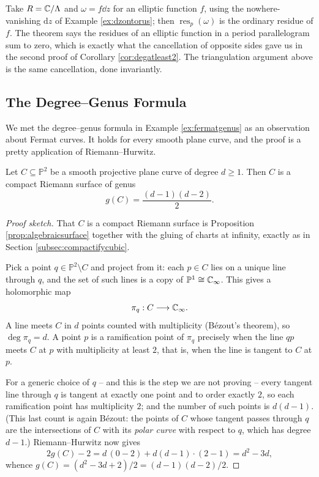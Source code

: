 \documentclass[a4paper]{scrartcl}
\newcommand{\Cinf}{\C_\infty}
\newcommand{\res}{\operatorname{res}}
\begin{document}
\begin{example}
	Take $R = \mathbb{C}/\Lambda$ and $\omega = f\dd z$ for an elliptic function $f$, using the
	nowhere-vanishing $\mathrm{d}z$ of Example \ref{ex:dzontorus}; then $\res_p(\omega)$ is the
	ordinary residue of $f$. The theorem says the residues of an elliptic function in a
	period parallelogram sum to zero, which is exactly what the cancellation of opposite
	sides gave us in the second proof of Corollary \ref{cor:degatleast2}. The
	triangulation argument above is the same cancellation, done invariantly.
\end{example}

\subsection{The Degree--Genus Formula}

We met the degree--genus formula in Example \ref{ex:fermatgenus} as an observation about
Fermat curves. It holds for every smooth plane curve, and the proof is a pretty
application of Riemann--Hurwitz.

\begin{theorem}\label{thm:degreegenus}
	Let $C \subseteq \mathbb{P}^2$ be a smooth projective plane curve of degree $d \geq 1$.
	Then $C$ is a compact Riemann surface of genus
	$$
	g(C) = \frac{(d-1)(d-2)}{2}.
	$$
\end{theorem}

\begin{proof}[Proof sketch]
	That $C$ is a compact Riemann surface is Proposition \ref{prop:algebraicsurface}
	together with the gluing of charts at infinity, exactly as in Section
	\ref{subsec:compactifycubic}.

	Pick a point $q \in \mathbb{P}^2 \setminus C$ and project from it: each $p \in C$ lies
	on a unique line through $q$, and the set of such lines is a copy of
	$\mathbb{P}^1 \cong \Cinf$. This gives a holomorphic map
	$$
	\pi_q : C \longrightarrow \Cinf.
	$$
	A line meets $C$ in $d$ points counted with multiplicity (B\'ezout's theorem), so
	$\deg \pi_q = d$. A point $p$ is a ramification point of $\pi_q$ precisely when the
	line $qp$ meets $C$ at $p$ with multiplicity at least $2$, that is, when the line is
	tangent to $C$ at $p$.

	For a generic choice of $q$ -- and this is the step we are not proving -- every tangent
	line through $q$ is tangent at exactly one point and to order exactly $2$, so each
	ramification point has multiplicity $2$; and the number of such points is $d(d-1)$.
	(This last count is again B\'ezout: the points of $C$ whose tangent passes through $q$
	are the intersections of $C$ with its \emph{polar curve} with respect to $q$, which has
	degree $d - 1$.) Riemann--Hurwitz now gives
	$$
	2g(C) - 2 = d\,(0 - 2) + d(d-1)\cdot(2-1) = d^2 - 3d,
	$$
	whence $g(C) = (d^2-3d+2)/2 = (d-1)(d-2)/2$.
\end{proof}
\end{document}
